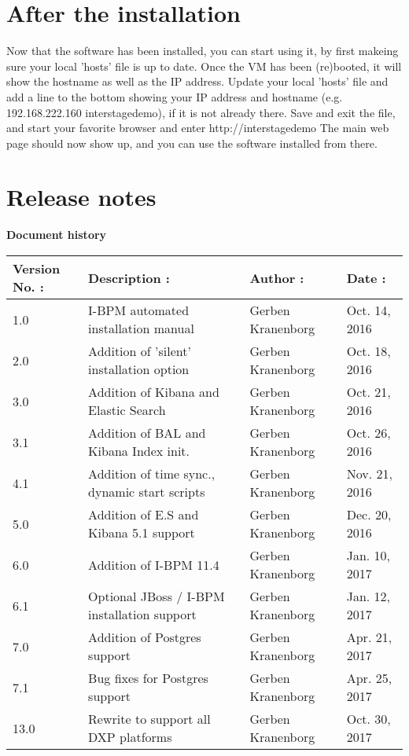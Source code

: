 {\let\clearpage\relax\par \chapter{After the installation}}

\begin{myindent}
\noindent Now that the software has been installed, you can start using it, by first makeing sure your local 'hosts' file is up to date. Once the VM has been (re)booted, it will show the hostname as well as the IP address.
Update your local 'hosts' file and add a line to the bottom showing your IP address and hostname (e.g. 192.168.222.160	interstagedemo), if it is not already there.
Save and exit the file, and start your favorite browser and enter http://interstagedemo
The main web page should now show up, and you can use the software installed from there.
\end{myindent}

{\let\clearpage\relax\par \chapter{Release notes}}

\begin{center}
	\textbf{Document history}
	\begin{tabular}{|l|l|l|l|}
	\hline
	\textbf{Version No. :} & \textbf{Description :} & \textbf{Author :} & \textbf{Date :}\\
	\hline
	1.0 & I-BPM automated installation manual & Gerben Kranenborg & Oct. 14, 2016\\
	2.0 & Addition of 'silent' installation option & Gerben Kranenborg & Oct. 18, 2016\\
	3.0 & Addition of Kibana and Elastic Search & Gerben Kranenborg & Oct. 21, 2016\\
	3.1 & Addition of BAL and Kibana Index init. & Gerben Kranenborg & Oct. 26, 2016\\
	4.1 & Addition of time sync., dynamic start scripts & Gerben Kranenborg & Nov. 21, 2016\\
	5.0 & Addition of E.S and Kibana 5.1 support & Gerben Kranenborg & Dec. 20, 2016\\
	6.0 & Addition of I-BPM 11.4 & Gerben Kranenborg & Jan. 10, 2017\\
	6.1 & Optional JBoss / I-BPM installation support & Gerben Kranenborg & Jan. 12, 2017\\
	7.0 & Addition of Postgres support & Gerben Kranenborg & Apr. 21, 2017\\
	7.1 & Bug fixes for Postgres support & Gerben Kranenborg & Apr. 25, 2017\\
	13.0 & Rewrite to support all DXP platforms & Gerben Kranenborg & Oct. 30, 2017\\
	\hline
	\end{tabular}
\end{center}

